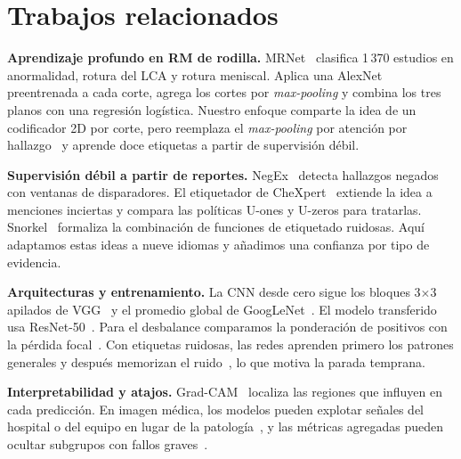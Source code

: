 \section{Trabajos relacionados}
\label{sec:related}

\textbf{Aprendizaje profundo en RM de rodilla.} MRNet~\citep{bien2018mrnet} clasifica
1\,370 estudios en anormalidad, rotura del LCA y rotura meniscal. Aplica una AlexNet
preentrenada a cada corte, agrega los cortes por \emph{max-pooling} y combina los tres planos
con una regresión logística. Nuestro enfoque comparte la idea de un codificador 2D por corte,
pero reemplaza el \emph{max-pooling} por atención por hallazgo~\citep{ilse2018attention} y
aprende doce etiquetas a partir de supervisión débil.

\textbf{Supervisión débil a partir de reportes.} NegEx~\citep{chapman2001negex} detecta
hallazgos negados con ventanas de disparadores. El etiquetador de CheXpert~\citep{irvin2019chexpert}
extiende la idea a menciones inciertas y compara las políticas U-ones y U-zeros para
tratarlas. Snorkel~\citep{ratner2017snorkel} formaliza la combinación de funciones de
etiquetado ruidosas. Aquí adaptamos estas ideas a nueve idiomas y añadimos una confianza
por tipo de evidencia.

\textbf{Arquitecturas y entrenamiento.} La CNN desde cero sigue los bloques 3$\times$3
apilados de VGG~\citep{simonyan2015vgg} y el promedio global de GoogLeNet~\citep{szegedy2015going}.
El modelo transferido usa ResNet-50~\citep{he2016resnet}. Para el desbalance comparamos la
ponderación de positivos con la pérdida focal~\citep{lin2017focal}. Con etiquetas ruidosas,
las redes aprenden primero los patrones generales y después memorizan el
ruido~\citep{arpit2017closer}, lo que motiva la parada temprana.

\textbf{Interpretabilidad y atajos.} Grad-CAM~\citep{selvaraju2017gradcam} localiza las
regiones que influyen en cada predicción. En imagen médica, los modelos pueden explotar
señales del hospital o del equipo en lugar de la patología~\citep{zech2018variable}, y las
métricas agregadas pueden ocultar subgrupos con fallos graves~\citep{oakden2020hidden}.
